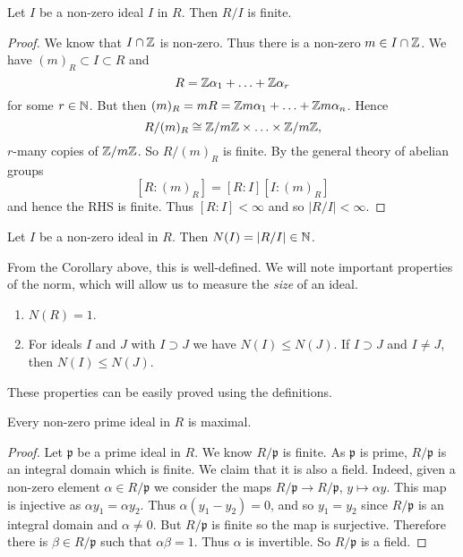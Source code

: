 
\begin{corollary}
	Let $I$ be a non-zero ideal $I$ in $R$.
	Then $R / I$ is finite.
\end{corollary}

\begin{proof}
	We know that $I \cap \mathbb{Z}$ is non-zero.
	Thus there is a non-zero $m \in I \cap \mathbb{Z}$.
	We have $(m)_R \subset I \subset R$ and
	\[
		R = \mathbb{Z} \alpha_1 + \ldots + \mathbb{Z} \alpha_r
	\]
	for some $r \in \mathbb{N}$.
	But then $(m)_R = mR = \mathbb{Z} m \alpha_1 + \ldots + \mathbb{Z} m \alpha_n$.
	Hence
	\[
		R / (m)_R \cong \mathbb{Z}/m\mathbb{Z} \times \ldots \times \mathbb{Z}/m\mathbb{Z},
	\]
	$r$-many copies of $\mathbb{Z}/m\mathbb{Z}$.
	So $R/(m)_R$ is finite.
	By the general theory of abelian groups
	\[
		[R: (m)_R] = [R:I][I:(m)_R]
	\]
	and hence the RHS is finite.
	Thus $[R:I] < \infty$ and so
	$\left\lvert R/I \right\rvert < \infty$.
\end{proof}

\begin{definition}[]
	Let $I$ be a non-zero ideal in $R$.
	Then $N(I) = \left\lvert R/I \right\rvert \in \mathbb{N}$.
\end{definition}

From the Corollary above, this is well-defined.
We will note important properties of the norm, which will allow us to measure
the \emph{size} of an ideal.
\begin{enumerate}
	\item $N(R) = 1$.
	\item For ideals $I$ and $J$ with $I \supset J$ we have
		$N(I) \leq N(J)$. If $I \supset J$ and $I \neq J$, then
		$N(I) \leq N(J)$.
\end{enumerate}
These properties can be easily proved using the definitions.

\begin{proposition}[]
	Every non-zero prime ideal in $R$ is maximal.
\end{proposition}

\begin{proof}
	Let $\mathfrak p$ be a prime ideal in $R$.
	We know $R/\mathfrak p$ is finite.
	As $\mathfrak p$ is prime, $R/\mathfrak p$ is an integral domain
	which is finite.
	We claim that it is also a field.
	Indeed, given a non-zero element $\alpha \in R/\mathfrak p$ we consider
	the maps $R / \mathfrak p \to R / \mathfrak p$, $y \mapsto \alpha y$.
	This map is injective as $\alpha y_1 = \alpha y_2$.
	Thus $\alpha(y_1 - y_2) = 0$, and so $y_1 = y_2$ since $R/\mathfrak p$
	is an integral domain and $\alpha \neq 0$.
	But $R/\mathfrak p$ is finite so the map is surjective.
	Therefore there is $\beta \in R/\mathfrak p$ such that $\alpha \beta = 1$.
	Thus $\alpha$ is invertible.
	So $R/\mathfrak p$ is a field.
\end{proof}

